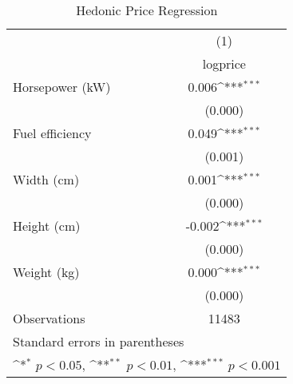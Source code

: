 \begin{table}[htbp]\centering
\def\sym#1{\ifmmode^{#1}\else\(^{#1}\)\fi}
\caption{Hedonic Price Regression \label{tab2}}
\begin{tabular}{l*{1}{c}}
\hline\hline
                    &\multicolumn{1}{c}{(1)}\\
                    &\multicolumn{1}{c}{logprice}\\
\hline
Horsepower (kW)     &       0.006\sym{***}\\
                    &     (0.000)         \\
[1em]
Fuel efficiency     &       0.049\sym{***}\\
                    &     (0.001)         \\
[1em]
Width (cm)          &       0.001\sym{***}\\
                    &     (0.000)         \\
[1em]
Height (cm)         &      -0.002\sym{***}\\
                    &     (0.000)         \\
[1em]
Weight (kg)         &       0.000\sym{***}\\
                    &     (0.000)         \\
\hline
Observations        &       11483         \\
\hline\hline
\multicolumn{2}{l}{\footnotesize Standard errors in parentheses}\\
\multicolumn{2}{l}{\footnotesize \sym{*} \(p<0.05\), \sym{**} \(p<0.01\), \sym{***} \(p<0.001\)}\\
\end{tabular}
\end{table}
